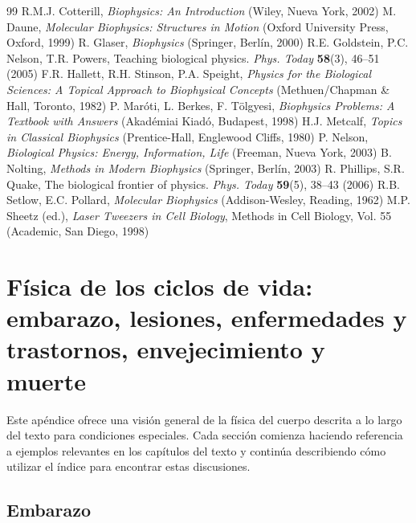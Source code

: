 \documentclass[12pt,a4paper]{book}
\begin{document}
\begin{thebibliography}{99}
 R.M.J. Cotterill, \textit{Biophysics: An Introduction} (Wiley, Nueva York, 2002)
 M. Daune, \textit{Molecular Biophysics: Structures in Motion} (Oxford University Press, Oxford, 1999)
 R. Glaser, \textit{Biophysics} (Springer, Berlín, 2000)
 R.E. Goldstein, P.C. Nelson, T.R. Powers, Teaching biological physics. \textit{Phys. Today} \textbf{58}(3), 46--51 (2005)
 F.R. Hallett, R.H. Stinson, P.A. Speight, \textit{Physics for the Biological Sciences: A Topical Approach to Biophysical Concepts} (Methuen/Chapman \& Hall, Toronto, 1982)
 P. Maróti, L. Berkes, F. Tölgyesi, \textit{Biophysics Problems: A Textbook with Answers} (Akadémiai Kiadó, Budapest, 1998)
 H.J. Metcalf, \textit{Topics in Classical Biophysics} (Prentice-Hall, Englewood Cliffs, 1980)
 P. Nelson, \textit{Biological Physics: Energy, Information, Life} (Freeman, Nueva York, 2003)
 B. Nolting, \textit{Methods in Modern Biophysics} (Springer, Berlín, 2003)
 R. Phillips, S.R. Quake, The biological frontier of physics. \textit{Phys. Today} \textbf{59}(5), 38--43 (2006)
 R.B. Setlow, E.C. Pollard, \textit{Molecular Biophysics} (Addison-Wesley, Reading, 1962)
 M.P. Sheetz (ed.), \textit{Laser Tweezers in Cell Biology}, Methods in Cell Biology, Vol. 55 (Academic, San Diego, 1998)
\end{thebibliography}


\chapter[Física de los Ciclos de Vida]{Física de los ciclos de vida: embarazo, lesiones, enfermedades y trastornos, envejecimiento y muerte}
\label{app:f}

Este apéndice ofrece una visión general de la física del cuerpo descrita a lo largo del texto para condiciones especiales. Cada sección comienza haciendo referencia a ejemplos relevantes en los capítulos del texto y continúa describiendo cómo utilizar el índice para encontrar estas discusiones.

\section{Embarazo}
\label{sec:f1}
\end{document}
